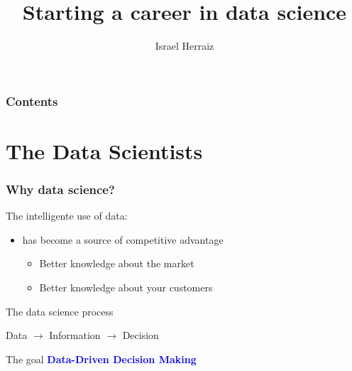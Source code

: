 \documentclass[11pt,xcolor=svgnames]{beamer}
\title{Starting a career in data science}
\author{Israel Herraiz}
\begin{document}
\maketitle

\begin{frame}
  \frametitle{Contents}
  \tableofcontents
\end{frame}



\AtBeginSection{
\begin{frame}
  \frametitle{}
  \tableofcontents[currentsection]
\end{frame}
}

\section{The Data Scientists}
\label{sec-1}

   
\begin{frame}[fragile]\frametitle{Why data science?}

  The intelligente use of data:
  \begin{itemize}
  \item has become a source of competitive advantage
    \begin{itemize}
    \item Better knowledge about the market
    \item Better knowledge about your customers
    \end{itemize}
  \end{itemize}

  \pause

  \begin{block}{The data science process}
    \begin{center}
      Data $\rightarrow$ Information $\rightarrow$ Decision
    \end{center}
  \end{block}

\pause

  \begin{exampleblock}{The goal}
    \centering \textcolor{blue}{\bf Data-Driven Decision Making}
  \end{exampleblock}
  
\end{frame}
\end{document}
